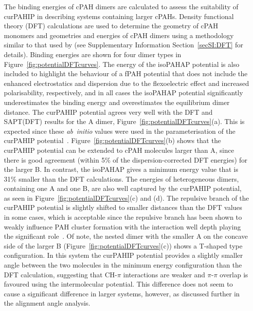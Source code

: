 The binding energies of cPAH dimers are calculated to assess the suitability of curPAHIP in describing systems containing larger cPAHs. Density functional theory (DFT) calculations are used to determine the geometry of cPAH monomers and geometries and energies of cPAH dimers using a methodology similar to that used by \citet{Martin2018polar} (see Supplementary Information Section~\ref{secSI:DFT} for details). Binding energies are shown for four dimer types in Figure~\ref{fig:potentialDFTcurves}. The energy of the isoPAHAP potential is also included to highlight the behaviour of a fPAH potential that does not include the enhanced electrostatics and dispersion due to the flexoelectric effect and increased polarisability, respectively, and in all cases the isoPAHAP potential significantly underestimates the binding energy and overestimates the equilibrium dimer distance.
The curPAHIP potential agrees very well with the DFT and SAPT(DFT) results for the A dimer, Figure~\ref{fig:potentialDFTcurves}(a). This is expected since these \textit{ab~initio} values were used in the parameterisation of the curPAHIP potential~\cite{bowal2019ion}. 
Figure~\ref{fig:potentialDFTcurves}(b) shows that the curPAHIP potential can be extended to cPAH molecules larger than A, since there is good agreement (within 5\% of the dispersion-corrected DFT energies) for the larger B. In contrast, the isoPAHAP gives a minimum energy value that is 31\% smaller than the DFT calculations.
The energies of heterogeneous dimers, containing one A and one B, are also well captured by the curPAHIP potential, as seen in Figure~\ref{fig:potentialDFTcurves}(c) and (d). The repulsive branch of the curPAHIP potential is slightly shifted to smaller distances than the DFT values in some cases, which is acceptable since the repulsive branch has been shown to weakly influence PAH cluster formation with the interaction well depth playing the significant role~\cite{Pascazio2017}. Of note, the nested dimer with the smaller A on the concave side of the larger B (Figure~\ref{fig:potentialDFTcurves}(c)) shows a T-shaped type configuration. In this system the curPAHIP potential provides a slightly smaller %
angle between the two molecules in the minimum energy configuration than the DFT calculation, suggesting that CH-$\pi$ interactions are weaker and $\pi$-$\pi$ overlap is favoured using the intermolecular potential.  This difference does not seem to cause a significant difference in larger systems, however, as discussed further in the alignment angle analysis. 
%
